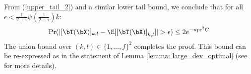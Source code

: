 \begin{IEEEproof}

	From (\ref{upper_tail_2}) and a similar lower tail bound, we conclude that for all $\epsilon<\frac{1}{2+\tau} \psi(\frac{1}{2+\tau}) \overline{k}$:
	\begin{equation*} 
			\Pr(|[\bT(\bX)]_{k,l}-\E[[\bT(\bX)]_{k,l}]|>\epsilon) \leq 2 e^{-np\epsilon^2 C}
	\end{equation*}
	The union bound over $(k,l)\in \{1,\dots,f\}^2$ completes the proof. This bound can be re-expressed as in the statement of Lemma \ref{lemma: large_dev_optimal} (see \cite{TsiligkaridisTSP} for more details).
\end{IEEEproof}
